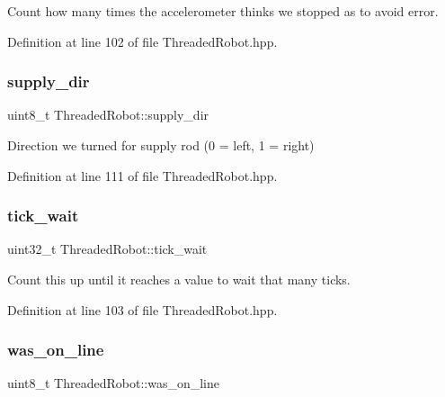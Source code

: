 Count how many times the accelerometer thinks we stopped as to avoid error. 



Definition at line 102 of file Threaded\+Robot.\+hpp.

\mbox{\label{class_threaded_robot_aa895dd29f7418754d4dfb8555572ae31}} 
\subsubsection{\texorpdfstring{supply\+\_\+dir}{supply\_dir}}
{\footnotesize\ttfamily uint8\+\_\+t Threaded\+Robot\+::supply\+\_\+dir\hspace{0.3cm}{\ttfamily [private]}}



Direction we turned for supply rod (0 = left, 1 = right) 



Definition at line 111 of file Threaded\+Robot.\+hpp.

\mbox{\label{class_threaded_robot_a314047099d4d38a60d54cc8b81012c7c}} 
\subsubsection{\texorpdfstring{tick\+\_\+wait}{tick\_wait}}
{\footnotesize\ttfamily uint32\+\_\+t Threaded\+Robot\+::tick\+\_\+wait\hspace{0.3cm}{\ttfamily [private]}}



Count this up until it reaches a value to wait that many ticks. 



Definition at line 103 of file Threaded\+Robot.\+hpp.

\mbox{\label{class_threaded_robot_a8d78ef13e34e29ab23aafedcdddc4ae4}} 
\subsubsection{\texorpdfstring{was\+\_\+on\+\_\+line}{was\_on\_line}}
{\footnotesize\ttfamily uint8\+\_\+t Threaded\+Robot\+::was\+\_\+on\+\_\+line\hspace{0.3cm}{\ttfamily [private]}}




